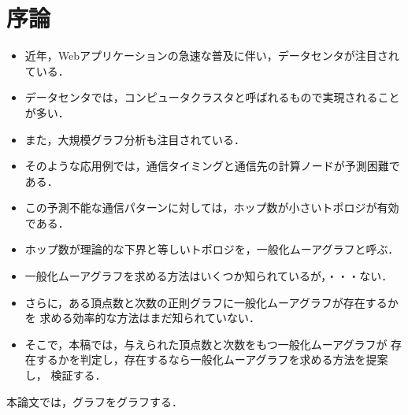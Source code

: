 
\chapter{序論}
\begin{itemize}
\item 近年，Webアプリケーションの急速な普及に伴い，データセンタが注目されている．
\item データセンタでは，コンピュータクラスタと呼ばれるもので実現されることが多い．
\item また，大規模グラフ分析も注目されている．
\item そのような応用例では，通信タイミングと通信先の計算ノードが予測困難である．
\item この予測不能な通信パターンに対しては，ホップ数が小さいトポロジが有効である．
\item ホップ数が理論的な下界と等しいトポロジを，一般化ムーアグラフと呼ぶ．
\item 一般化ムーアグラフを求める方法はいくつか知られているが，・・・ない．
\item さらに，ある頂点数と次数の正則グラフに一般化ムーアグラフが存在するかを
  求める効率的な方法はまだ知られていない．
\item そこで，本稿では，与えられた頂点数と次数をもつ一般化ムーアグラフが
  存在するかを判定し，存在するなら一般化ムーアグラフを求める方法を提案し，
  検証する．
\end{itemize}
本論文では，グラフをグラフする．
